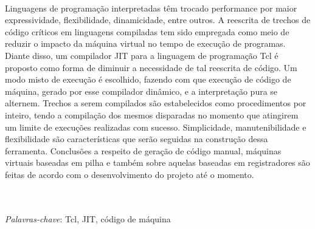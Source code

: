 \\
Linguagens de programação interpretadas têm trocado performance por
maior expressividade, flexibilidade, dinamicidade, entre outros.
A reescrita de trechos de código críticos em linguagens compiladas tem
sido empregada como meio de reduzir o impacto da máquina virtual no
tempo de execução de programas. Diante disso, um compilador JIT para a
linguagem de programação Tcl é proposto como forma de diminuir a
necessidade de tal reescrita de código. Um modo misto de execução é
escolhido, fazendo com que execução de código de máquina, gerado por
esse compilador dinâmico, e a interpretação pura se
alternem.
Trechos a serem compilados são estabelecidos como procedimentos por
inteiro, tendo a compilação dos mesmos disparadas no momento que atingirem
um limite de execuções realizadas com sucesso.
Simplicidade, manutenibilidade e flexibilidade são
características que serão seguidas na construção dessa ferramenta.
Conclusões a respeito de geração de código manual, máquinas virtuais baseadas
em pilha e também sobre aquelas baseadas em registradores são feitas
de acordo com o desenvolvimento do projeto até o momento.

\quad\\
\quad\\
\textit{Palavras-chave}: Tcl, JIT, código de máquina
